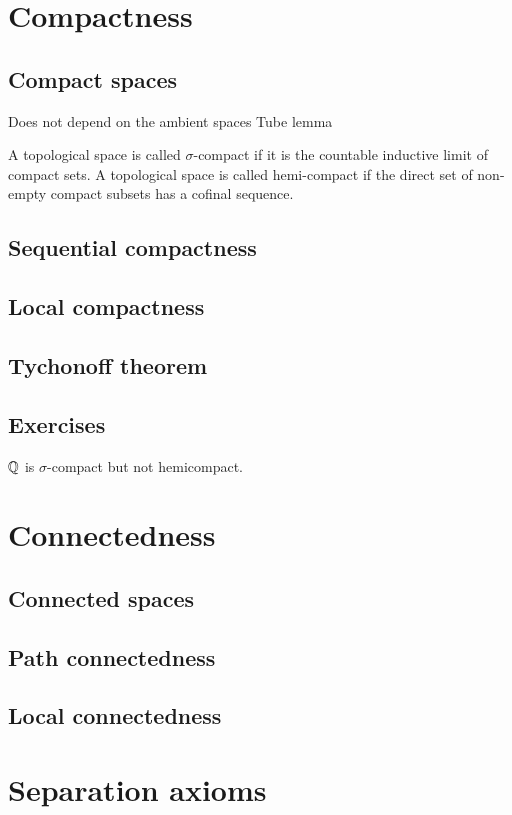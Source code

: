 \documentclass{../../large}
\begin{document}
\chapter{Compactness}
\section{Compact spaces}

Does not depend on the ambient spaces
Tube lemma



A topological space is called $\sigma$-compact if it is the countable inductive limit of compact sets.
A topological space is called hemi-compact if the direct set of non-empty compact subsets has a cofinal sequence.

\section{Sequential compactness}
\section{Local compactness}
\section{Tychonoff theorem}
\section*{Exercises}
\begin{prb}
$\mathbb{Q}$ is $\sigma$-compact but not hemicompact.
\end{prb}
\chapter{Connectedness}
\section{Connected spaces}
\section{Path connectedness}
\section{Local connectedness}



\chapter{Separation axioms}
\end{document}
